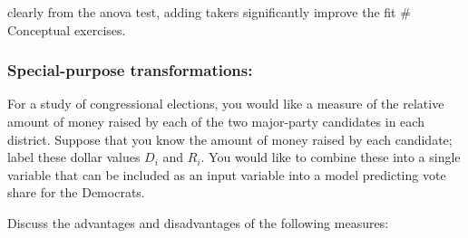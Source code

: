 \documentclass[]{article}
\begin{document}
clearly from the anova test, adding takers significantly improve the fit
\# Conceptual exercises.

\hypertarget{special-purpose-transformations}{%
\subsubsection{Special-purpose
transformations:}\label{special-purpose-transformations}}

For a study of congressional elections, you would like a measure of the
relative amount of money raised by each of the two major-party
candidates in each district. Suppose that you know the amount of money
raised by each candidate; label these dollar values \(D_i\) and \(R_i\).
You would like to combine these into a single variable that can be
included as an input variable into a model predicting vote share for the
Democrats.

Discuss the advantages and disadvantages of the following measures:
\end{document}
